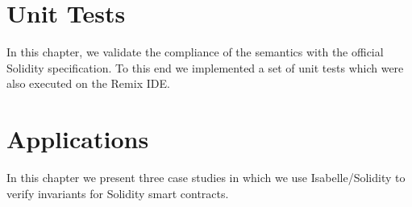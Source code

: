 \documentclass[10pt,DIV17,a4paper,abstract=true,twoside=semi,openright]
{scrreprt}
\begin{document}


\chapter{Unit Tests}

In this chapter, we validate the compliance of the semantics with the official Solidity specification.
To this end we implemented a set of unit tests which were also executed on the Remix IDE.





\chapter{Applications}

In this chapter we present three case studies in which we use Isabelle/Solidity to verify
invariants for Solidity smart contracts.















%    
\end{document}
